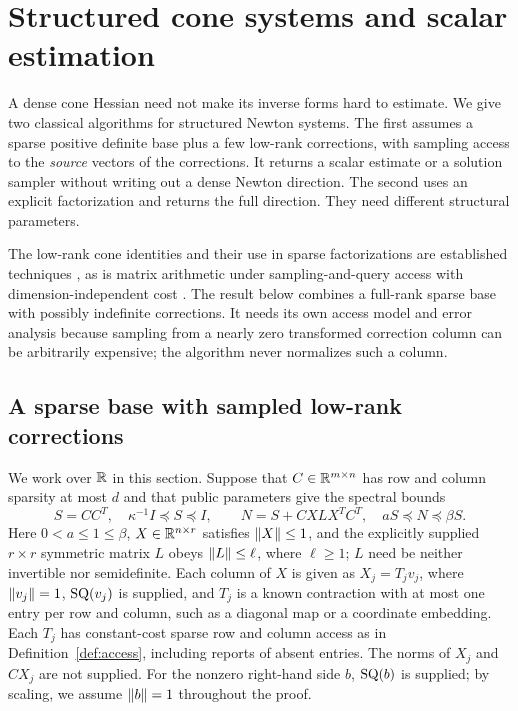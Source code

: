 \section{Structured cone systems and scalar estimation}\label{sec:structured}
A dense cone Hessian need not make its inverse forms hard to estimate. We
give two classical algorithms for structured Newton systems. The first
assumes a sparse positive definite base plus a few low-rank corrections,
with sampling access to the \emph{source} vectors of the corrections. It
returns a scalar estimate or a solution sampler without writing out a
dense Newton direction. The second uses an explicit factorization and
returns the full direction. They need different structural parameters.

The low-rank cone identities and their use in sparse factorizations are
established techniques \citep{AlizadehGoldfarb2003,GoldfarbScheinberg2005,ChenGoulart2025},
as is matrix arithmetic under sampling-and-query access with
dimension-independent cost \citep{ChiaEtAl2022}. The result below combines
a full-rank sparse base with possibly indefinite corrections. It needs its
own access model and error analysis because sampling from a nearly zero
transformed correction column can be arbitrarily expensive; the algorithm
never normalizes such a column.

\subsection{A sparse base with sampled low-rank corrections}
We work over $\mathbb R$ in this section. Suppose that $C\in\mathbb R^{m\times n}$ has
row and column sparsity at most $d$ and that public parameters give the
spectral bounds
\begin{equation}\label{eq:structured-model}
 S=CC^T,\quad \kappa^{-1}I\preceq S\preceq I,\qquad
 N=S+CXLX^TC^T,\quad aS\preceq N\preceq\beta S.
\end{equation}
Here $0<a\leq1\leq\beta$, $X\in\mathbb R^{n\times r}$ satisfies $\left\lVert X\right\rVert\leq1$,
and the explicitly supplied $r\times r$ symmetric matrix $L$ obeys
$\left\lVert L\right\rVert\leq\ell$, where $\ell\geq1$; $L$ need be neither invertible nor
semidefinite. Each column of $X$ is given as $X_j=T_jv_j$, where
$\left\lVert v_j\right\rVert=1$, $\mathrm{SQ}(v_j)$ is supplied, and $T_j$ is a known contraction
with at most one entry per row and column, such as a diagonal map or a
coordinate embedding. Each $T_j$ has constant-cost sparse row and column
access as in Definition~\ref{def:access}, including reports of absent
entries. The norms of $X_j$ and $CX_j$ are not supplied. For the nonzero
right-hand side $b$, $\mathrm{SQ}(b)$ is supplied; by scaling, we assume
$\left\lVert b\right\rVert=1$ throughout the proof.

